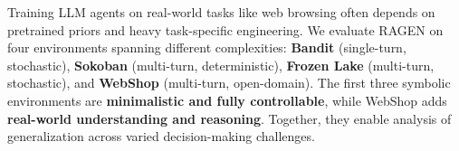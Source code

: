 
Training LLM agents on real-world tasks like web browsing often depends on pretrained priors and heavy task-specific engineering. 
We evaluate RAGEN on four environments spanning different complexities: \textbf{Bandit} (single-turn, stochastic), \textbf{Sokoban} (multi-turn, deterministic), \textbf{Frozen Lake} (multi-turn, stochastic), and \textbf{WebShop} (multi-turn, open-domain).
The first three symbolic environments are \textbf{minimalistic and fully controllable}, while WebShop adds \textbf{real-world understanding and reasoning}. 
Together, they enable analysis of generalization across varied decision-making challenges.


